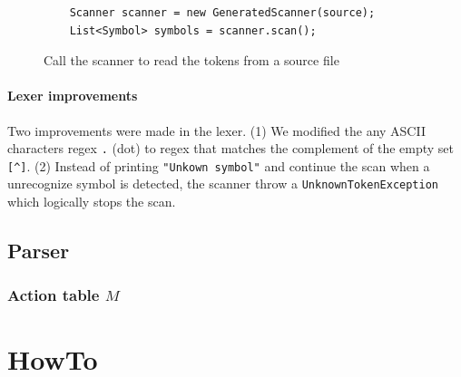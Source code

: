 \documentclass[letterpaper]{article}
\begin{document}
\begin{figure}[H]
    \begin{lstlisting}
    Scanner scanner = new GeneratedScanner(source);
    List<Symbol> symbols = scanner.scan();
    \end{lstlisting}
    \caption{Call the scanner to read the tokens from a source file}
    \label{fig:scannercall}
\end{figure}

\paragraph{Lexer improvements}

Two improvements were made in the lexer. (1) We modified the any ASCII
characters
regex \texttt{.} (dot) to regex that matches the complement of the
empty set \texttt{[\textasciicircum]}.
(2) Instead of printing \texttt{"Unkown symbol"}
and continue the scan when
a unrecognize symbol is detected, the scanner throw a
\texttt{UnknownTokenException} which logically stops the scan.



\subsection{Parser}

\subsubsection{Action table $M$}

\label{implactiontable}

\section{HowTo}

\label{howto}
\end{document}
